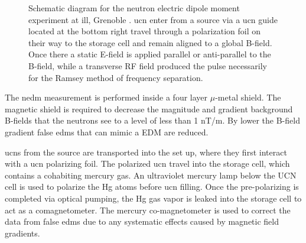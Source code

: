 \begin{figure} [htbp]
	\caption {Schematic diagram for the neutron electric dipole moment experiment at \gls{ill}, Grenoble \cite{Baker2014}. \gls{ucn} enter from a source via a \gls{ucn} guide located at the bottom right travel through a polarization foil on their way to the storage cell and remain aligned to a global B-field. Once there a static E-field is applied parallel or anti-parallel to the B-field, while a transverse RF field produced the pulse necessarily for the Ramsey method of frequency separation.}
		\label{fig:nedm}
\end{figure}

The \gls{nedm} measurement is performed inside a four layer $\mu$-metal shield. The magnetic shield is required to decrease the magnitude and gradient background B-fields that the neutrons see to a level of less than 1 nT/m. By lower the B-field gradient false \gls{edm}s that can mimic a EDM are reduced.

\gls{ucn}s from the source are transported into the set up, where they first interact with a \gls{ucn} polarizing foil.  The polarized \gls{ucn} travel into the storage cell, which contains a cohabiting mercury gas. An ultraviolet mercury lamp below the UCN cell is used to polarize the Hg atoms before \gls{ucn} filling. Once the pre-polarizing is completed via optical pumping, the Hg gas vapor is leaked into the storage cell to act as a comagnetometer. The mercury co-magnetometer is used to correct the data from false \gls{edm}s due to any systematic effects caused by magnetic field gradients.

